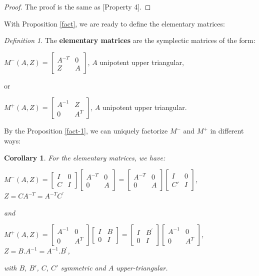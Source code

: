 \documentclass[10pt]{amsart}
\newtheorem{coro}[theo]{Corollary}
\theoremstyle{remark}
\newtheorem{defi}[theo]{Definition}
\begin{document}
\begin{proof}
    The proof is the same as \cite{JTZ}[Property 4]. 
\end{proof}
With Proposition \ref{fact}, we are ready to define the elementary matrices:
\begin{defi}\label{def-ele}
     The \textbf{elementary matrices} are the symplectic matrices of the form: 
    \begin{center}
       $M^{-}(A,Z) = \left[\begin{array}{ccc} A^{-T} & 0 \\ Z & A\end{array}\right] $,  $A$ unipotent upper triangular, 
    \end{center}
  or
    \begin{center}
    $M^{+}(A,Z)= \left[\begin{array}{ccc} A^{-1} & Z \\ 0 & A^{T}\end{array}\right]$, $A$ unipotent upper triangular. 
\end{center}

\end{defi}
By the Proposition \ref{fact-1}, we can uniquely factorize $M^-$ and $M^+$ in different ways: 
\begin{coro}\label{fact-imp}
For the elementary matrices, we have:
  \begin{center}
    $M^{-}(A,Z) =\left[\begin{array}{ccc} I & 0 \\ C & I\end{array}\right]\left[\begin{array}{ccc} A^{-T} & 0 \\ 0 & A\end{array}\right]= \left[\begin{array}{ccc} A^{-T} & 0 \\ 0 & A\end{array}\right] \left[\begin{array}{ccc} I & 0 \\ C' & I\end{array}\right]$,  $Z = CA^{-T} = A^{-T}C^{\prime}$ 
\end{center}
and
\begin{center}
    $M^{+}(A,Z) = \left[\begin{array}{ccc} A^{-1} & 0 \\ 0 & A^T\end{array}\right]\left[\begin{array}{ccc} I & B \\ 0 & I\end{array}\right] =  \left[\begin{array}{ccc} I & B^{\prime} \\ 0 & I\end{array}\right] \left[\begin{array}{ccc} A^{-1} & 0 \\ 0 & A^T\end{array}\right]$, $Z = B.A^{-1} = A^{-1}.B^{\prime}$,
\end{center}  
with $B$, $B'$, $C$, $C'$ symmetric and $A$ upper-triangular. 
\end{coro}
\end{document}
